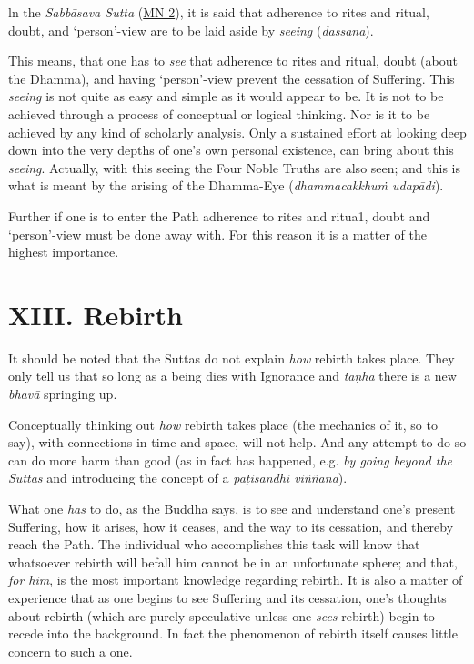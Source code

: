 ln the \textit{Sabbāsava Sutta} (\href{https://suttacentral.net/mn2/en/bodhi}{MN 2}), it is said that adherence to rites and ritual, doubt, and `person'-view are to be laid aside by \emph{seeing} (\textit{dassana}).

This means, that one has to \emph{see} that adherence to rites and ritual, doubt (about the Dhamma), and having `person'-view prevent the cessation of Suffering. This \emph{seeing} is not quite as easy and simple as it would appear to be. It is not to be achieved through a process of conceptual or logical thinking. Nor is it to be achieved by any kind of scholarly analysis. Only a sustained effort at looking deep down into the very depths of one's own personal existence, can bring about this \emph{seeing}. Actually, with this seeing the Four Noble Truths are also seen; and this is what is meant by the arising of the Dhamma-Eye (\textit{dhammacakkhuṁ udapādi}).

Further if one is to enter the Path adherence to rites and ritua1, doubt and `person'-view must be done away with. For this reason it is a matter of the highest importance.

\hypertarget{_xiii_rebirth}{%
\section{XIII. Rebirth}\label{_xiii_rebirth}}

It should be noted that the Suttas do not explain \emph{how} rebirth takes place. They only tell us that so long as a being dies with Ignorance and \textit{taṇhā} there is a new \textit{bhavā} springing up.

Conceptually thinking out \emph{how} rebirth takes place (the mechanics of it, so to say), with connections in time and space, will not help. And any attempt to do so can do more harm than good (as in fact has happened, e.g. \emph{by going beyond the Suttas} and introducing the concept of a \textit{paṭisandhi viññāna}).

What one \emph{has} to do, as the Buddha says, is to see and understand one's present Suffering, how it arises, how it ceases, and the way to its cessation, and thereby reach the Path. The individual who accomplishes this task will know that whatsoever rebirth will befall him cannot be in an unfortunate sphere; and that, \emph{for him}, is the most important knowledge regarding rebirth. It is also a matter of experience that as one begins to see Suffering and its cessation, one's thoughts about rebirth (which are purely speculative unless one \emph{sees} rebirth) begin to recede into the background. In fact the phenomenon of rebirth itself causes little concern to such a one.


